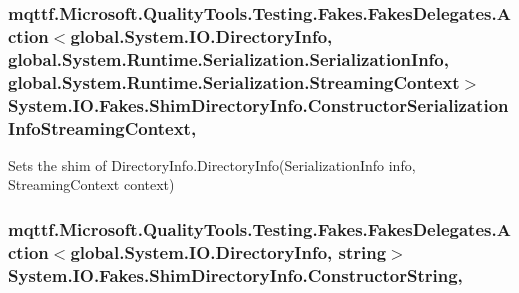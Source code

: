 \hypertarget{class_system_1_1_i_o_1_1_fakes_1_1_shim_directory_info_aedaeee0c7b142458cc7229bcff2beb56}{
\subsubsection[{Constructor\-Serialization\-Info\-Streaming\-Context}]{\setlength{\rightskip}{0pt plus 5cm}mqttf.\-Microsoft.\-Quality\-Tools.\-Testing.\-Fakes.\-Fakes\-Delegates.\-Action$<$global.\-System.\-I\-O.\-Directory\-Info, global.\-System.\-Runtime.\-Serialization.\-Serialization\-Info, global.\-System.\-Runtime.\-Serialization.\-Streaming\-Context$>$ System.\-I\-O.\-Fakes.\-Shim\-Directory\-Info.\-Constructor\-Serialization\-Info\-Streaming\-Context\hspace{0.3cm}{\ttfamily [static]}, {\ttfamily [set]}}}\label{class_system_1_1_i_o_1_1_fakes_1_1_shim_directory_info_aedaeee0c7b142458cc7229bcff2beb56}


Sets the shim of Directory\-Info.\-Directory\-Info(\-Serialization\-Info info, Streaming\-Context context)

\hypertarget{class_system_1_1_i_o_1_1_fakes_1_1_shim_directory_info_a4ad8fd77683673a8b1dc3b485dc2281e}{
\subsubsection[{Constructor\-String}]{\setlength{\rightskip}{0pt plus 5cm}mqttf.\-Microsoft.\-Quality\-Tools.\-Testing.\-Fakes.\-Fakes\-Delegates.\-Action$<$global.\-System.\-I\-O.\-Directory\-Info, string$>$ System.\-I\-O.\-Fakes.\-Shim\-Directory\-Info.\-Constructor\-String\hspace{0.3cm}{\ttfamily [static]}, {\ttfamily [set]}}}\label{class_system_1_1_i_o_1_1_fakes_1_1_shim_directory_info_a4ad8fd77683673a8b1dc3b485dc2281e}


